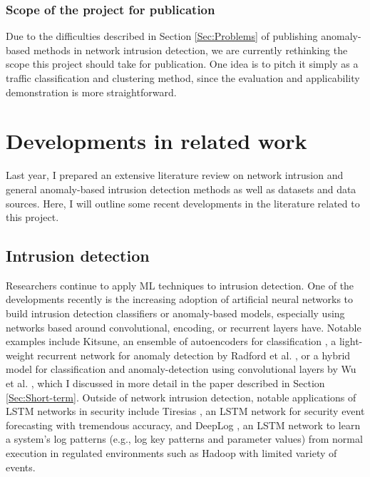 \documentclass[a4paper,12pt,twoside]{article}
\begin{document}
\subsubsection{Scope of the project for publication}

Due to the difficulties described in Section \ref{Sec:Problems} of publishing anomaly-based methods in network intrusion detection, we are currently rethinking the scope this project should take for publication. One idea is to pitch it simply as a traffic classification and clustering method, since the evaluation and applicability demonstration is more straightforward.



\section{Developments in related work}

Last year, I prepared an extensive literature review on network intrusion and general anomaly-based intrusion detection methods as well as datasets and data sources. Here, I will outline some recent developments in the literature related to this project.

\subsection{Intrusion detection}


Researchers continue to apply ML techniques to intrusion detection. One of the developments recently is the increasing adoption of artificial neural networks to build intrusion detection classifiers or anomaly-based models, especially using networks based around convolutional, encoding, or recurrent layers have.
Notable examples include Kitsune, an ensemble of autoencoders for classification \cite{mirsky2018kitsune}, a light-weight recurrent network for anomaly detection by Radford et al. \cite{radford2018network}, or a hybrid model for classification and anomaly-detection using convolutional layers by Wu et al. \cite{wu2018novel}, which I discussed in more detail in the paper described in Section \ref{Sec:Short-term}.
Outside of network intrusion detection, notable applications of LSTM networks in security include Tiresias \cite{shen2018tiresias}, an LSTM network for security event forecasting with tremendous accuracy, and DeepLog \cite{du2017deeplog}, an LSTM network to learn a system's log patterns (e.g., log key patterns and parameter values) from normal execution in regulated environments such as Hadoop with limited variety of events.
\end{document}
